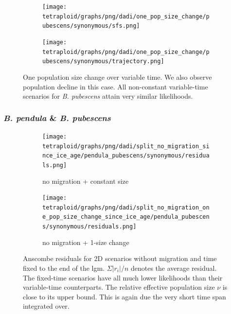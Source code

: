 \documentclass[hidelinks,11pt]{article}
\newcommand{\pendula}{\textit{B. pendula}}
\newcommand{\pubescens}{\textit{B. pubescens}}
\begin{document}
    \begin{figure}[H]
        \centering
        \begin{subfigure}[b]{0.465\textwidth}
            \texttt{[image: tetraploid/graphs/png/dadi/one\_pop\_size\_change/pubescens/synonymous/sfs.png]}
        \end{subfigure}
        \hfill
        \begin{subfigure}[b]{0.525\textwidth}
            \texttt{[image: tetraploid/graphs/png/dadi/one\_pop\_size\_change/pubescens/synonymous/trajectory.png]}
        \end{subfigure}
        \caption{One population size change over variable time. We also observe population decline in this case. All non-constant variable-time scenarios for \pubescens{} attain very similar likelihoods. }
        \label{fig:one_pop_size_change_pubescens}
    \end{figure}

    \subsubsection{\pendula{} \& \pubescens{}}

    \begin{figure}[H]
        \centering
        \begin{subfigure}[b]{0.49\textwidth}
            \texttt{[image: tetraploid/graphs/png/dadi/split\_no\_migration\_since\_ice\_age/pendula\_pubescens/synonymous/residuals.png]}
            \caption{no migration + constant size}
        \end{subfigure}
        \hfill
        \begin{subfigure}[b]{0.49\textwidth}
            \texttt{[image: tetraploid/graphs/png/dadi/split\_no\_migration\_one\_pop\_size\_change\_since\_ice\_age/pendula\_pubescens/synonymous/residuals.png]}
            \caption{no migration + 1-size change}
        \end{subfigure}
        \caption{Anscombe residuals for 2D scenarios without migration and time fixed to the end of the \acrshort{lgm}. $\Sigma |r_i|/n$ denotes the average residual. The fixed-time scenarios have all much lower likelihoods than their variable-time counterparts. The relative effective population size $\nu$ is close to its upper bound. This is again due the very short time span integrated over.}
        \label{fig:dadi_2d_residuals_no_migration_fixed_time}
    \end{figure}
\end{document}
